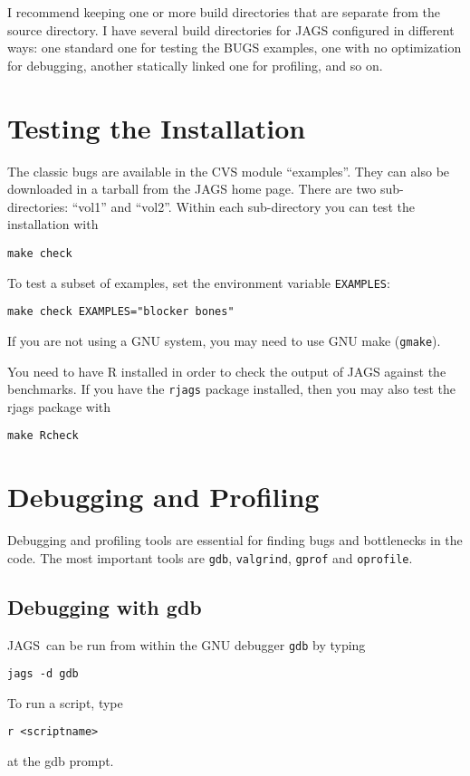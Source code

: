 \documentclass[11pt, a4paper, titlepage]{report}
\newcommand{\JAGS}{\textsf{JAGS}}
\begin{document}
I recommend keeping one or more build directories that are separate
from the source directory. I have several build directories for JAGS
configured in different ways: one standard one for testing the BUGS
examples, one with no optimization for debugging, another statically
linked one for profiling, and so on.

\chapter{Testing the Installation}

The classic bugs are available in the CVS module ``examples''. They
can also be downloaded in a tarball from the JAGS home page. There are
two sub-directories: ``vol1'' and ``vol2''. Within each sub-directory
you can test the installation with
\begin{verbatim}
make check
\end{verbatim}
To test a subset of examples, set the environment variable \verb+EXAMPLES+:
\begin{verbatim}
make check EXAMPLES="blocker bones"
\end{verbatim}
If you are not using a GNU system, you may need to use GNU make
(\verb+gmake+).

You need to have R installed in order to check the output of JAGS
against the benchmarks.  If you have the \texttt{rjags} package
installed, then you may also test the rjags package with
\begin{verbatim}
make Rcheck
\end{verbatim}

\chapter{Debugging and Profiling}
\label{chapter:debugging}

Debugging and profiling tools are essential for finding bugs and
bottlenecks in the code.  The most important tools are \texttt{gdb},
\texttt{valgrind}, \texttt{gprof} and \texttt{oprofile}.

\section{Debugging with gdb}

\JAGS\ can be run from within the GNU debugger \texttt{gdb} by typing
\begin{verbatim}
jags -d gdb
\end{verbatim}
To run a script, type
\begin{verbatim}
r <scriptname>
\end{verbatim}
at the gdb prompt. 
\end{document}
